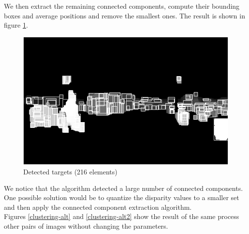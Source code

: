 \documentclass[a4paper,11pt]{article}
\begin{document}
We then extract the remaining connected components, compute their bounding boxes and average positions and remove the smallest ones. The result is shown in figure \ref{clustering}.

\begin{figure}[H]
\centering
\includegraphics[scale=0.5]{pic/detected-targets.png}
\caption{Detected targets (216 elements)}
\label{clustering}
\end{figure}

We notice that the algorithm detected a large number of connected components. One possible solution would be to quantize the disparity values to a smaller set and then apply the connected component extraction algorithm.\\
Figures \ref{clustering-alt} and \ref{clustering-alt2} show the result of the same process other pairs of images without changing the parameters.
\end{document}
